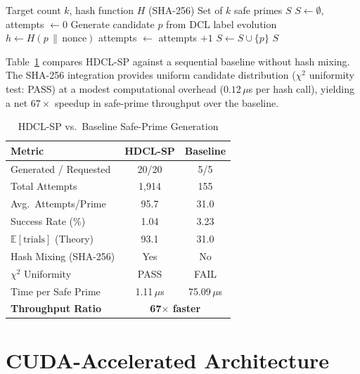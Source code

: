 \documentclass[lettersize,journal]{IEEEtran}
\begin{document}
\begin{algorithm}[!t]
\caption{HDCL-SP Safe Prime Sieve}\label{alg:hdcl}
\begin{algorithmic}
\REQUIRE Target count $k$, hash function $H$ (SHA-256)
\ENSURE Set of $k$ safe primes $S$
\STATE $S \leftarrow \emptyset$, attempts $\leftarrow 0$
    \STATE Generate candidate $p$ from DCL label evolution
    \STATE $h \leftarrow H(p \,\|\, \text{nonce})$ 
    \STATE attempts $\leftarrow$ attempts $+ 1$
        \STATE $S \leftarrow S \cup \{p\}$
    \ENDIF
\ENDWHILE
\RETURN $S$
\end{algorithmic}
\end{algorithm}

\noindent Table~\ref{tab:hdcl} compares HDCL-SP against a sequential baseline without hash mixing. The SHA-256 integration provides uniform candidate distribution ($\chi^2$ uniformity test: PASS) at a modest computational overhead ($0.12\,\mu$s per hash call), yielding a net $67\times$ speedup in safe-prime throughput over the baseline.

\begin{table}[!t]
\caption{HDCL-SP vs.\ Baseline Safe-Prime Generation\label{tab:hdcl}}
\centering
\begin{tabular}{@{}lcc@{}}
\toprule
\textbf{Metric} & \textbf{HDCL-SP} & \textbf{Baseline} \\
\midrule
Generated / Requested  & 20/20    & 5/5 \\
Total Attempts         & 1{,}914  & 155 \\
Avg.\ Attempts/Prime   & 95.7     & 31.0 \\
Success Rate (\%)      & 1.04     & 3.23 \\
$\mathbb{E}[\text{trials}]$ (Theory) & 93.1 & 31.0 \\
Hash Mixing (SHA-256)  & Yes      & No \\
$\chi^2$ Uniformity    & PASS     & FAIL \\
Time per Safe Prime    & 1.11\,$\mu$s & 75.09\,$\mu$s \\
\midrule
\textbf{Throughput Ratio} & \multicolumn{2}{c}{\textbf{67$\times$ faster}} \\
\bottomrule
\end{tabular}
\end{table}

\section{CUDA-Accelerated Architecture}
\label{sec:gpu}
\end{document}
